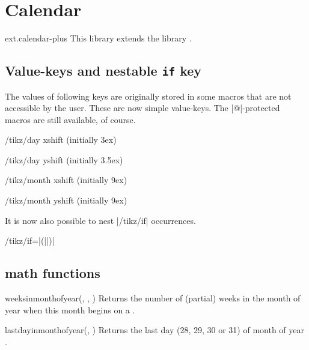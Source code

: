 %
%
%

\section{Calendar}
\begin{tikzlibrary}{ext.calendar-plus}
  This library extends the \tikzname\space library .
\end{tikzlibrary}

\begin{multicols}{2}

\subsection{Value-keys and nestable \texttt{if} key}

The values of following keys are originally stored in some macros that are not
accessible by the user. These are now simple value-keys.
The |@|-protected macros are still available, of course.

\begin{key}{/tikz/day xshift (initially 3ex)}
\end{key}
\begin{key}{/tikz/day yshift (initially 3.5ex)}
\end{key}
\begin{key}{/tikz/month xshift (initially 9ex)}
\end{key}
\begin{key}{/tikz/month yshift (initially 9ex)}
\end{key}

It is now also possible to nest |/tikz/if| occurrences.
\begin{key}{/tikz/if=|(||)|}
\end{key}

\subsection{\pgfname math functions}
\begin{math-function}{weeksinmonthofyear(, , )}
\mathcommand
  Returns the number of (partial) weeks in the month  of year 
  when this month begins on a .
\end{math-function}
\begin{math-function}{lastdayinmonthofyear(, )}
\mathcommand
  Returns the last day (28, 29, 30 or 31) of month  of year .
\end{math-function}


\end{multicols}
